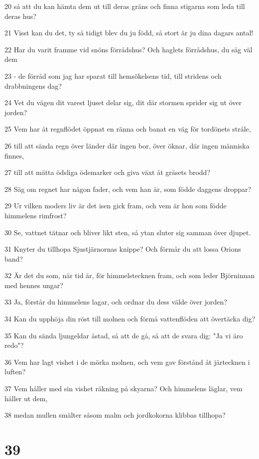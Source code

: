 \par 20 så att du kan hämta dem ut till deras gräns och finna stigarna som leda till deras hus?
\par 21 Visst kan du det, ty så tidigt blev du ju född, så stort är ju dina dagars antal!
\par 22 Har du varit framme vid snöns förrådshus? Och haglets förrådshus, du såg väl dem
\par 23 - de förråd som jag har sparat till hemsökelsens tid, till stridens och drabbningens dag?
\par 24 Vet du vägen dit varest ljuset delar sig, dit där stormen sprider sig ut över jorden?
\par 25 Vem har åt regnflödet öppnat en ränna och banat en väg för tordönets stråle,
\par 26 till att sända regn över länder där ingen bor, över öknar, där ingen människa finnes,
\par 27 till att mätta ödsliga ödemarker och giva växt åt gräsets brodd?
\par 28 Säg om regnet har någon fader, och vem han är, som födde daggens droppar?
\par 29 Ur vilken moders liv är det isen gick fram, och vem är hon som födde himmelens rimfrost?
\par 30 Se, vattnet tätnar och bliver likt sten, så ytan sluter sig samman över djupet.
\par 31 Knyter du tillhopa Sjustjärnornas knippe? Och förmår du att lossa Orions band?
\par 32 Är det du som, när tid är, för himmelstecknen fram, och som leder Björninnan med hennes ungar?
\par 33 Ja, förstår du himmelens lagar, och ordnar du dess välde över jorden?
\par 34 Kan du upphöja din röst till molnen och förmå vattenflöden att övertäcka dig?
\par 35 Kan du sända ljungeldar åstad, så att de gå, så att de svara dig: "Ja vi äro redo"?
\par 36 Vem har lagt vishet i de mörka molnen, och vem gav förstånd åt järtecknen i luften?
\par 37 Vem håller med sin vishet räkning på skyarna? Och himmelens läglar, vem häller ut dem,
\par 38 medan mullen smälter såsom malm och jordkokorna klibbas tillhopa?

\chapter{39}

